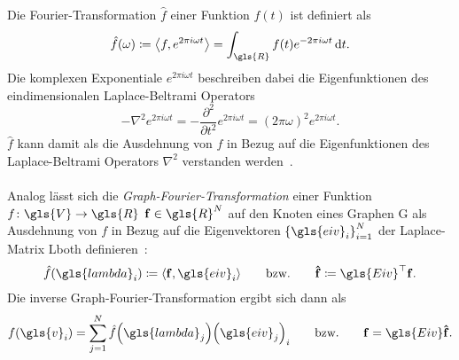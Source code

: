 Die Fourier-Transformation $\hat f$ einer Funktion $f\left(t\right)$ ist definiert als~\cite{Shuman}
\begin{equation*}
  \hat f\left(\omega\right) \coloneqq \left\langle f, e^{2\pi i\omega t} \right\rangle = \int_{\gls{R}} f\left(t\right)e^{-2\pi i\omega t}\,\mathrm{d}t.
\end{equation*}
Die komplexen Exponentiale $e^{2\pi i\omega t}$ beschreiben dabei die Eigenfunktionen des eindimensionalen Laplace-Beltrami Operators~\cite{Shuman}
\begin{equation}
  - \nabla^2 e^{2\pi i\omega t} = - \frac{\partial^2}{\partial t^2} e^{2\pi i \omega t} = {\left(2\pi \omega\right)}^2 e^{2\pi i\omega t}.
  \label{eq:laplace_eigenfunktionen}
\end{equation}
$\hat f$ kann damit als die Ausdehnung von $f$ in Bezug auf die Eigenfunktionen des Laplace-Beltrami Operators $\nabla^2$ verstanden werden~\cite{Hammond}.
\\\\
Analog lässt sich die \emph{Graph-Fourier-Transformation} einer Funktion $f \colon \gls{V} \to \gls{R}$ \bzw{} $\ve{f} \in \gls{R}^N$ auf den Knoten eines Graphen \gls{G} als Ausdehnung von $f$ in Bezug auf die Eigenvektoren ${\left\{\gls{eiv}_i\right\}}_{i=1}^N$ der Laplace-Matrix \gls{Lboth} definieren~\cite{Shuman}:
\begin{equation}
  \hat f\left(\gls{lambda}_i\right) \coloneqq \left\langle \ve{f}, \gls{eiv}_i \right\rangle
  \qquad
  \text{\bzw{}}
  \qquad
  \ve{\hat f} \coloneqq \gls{Eiv}^{\top}\ve{f}.
  \label{eq:graph_fourier_transformation}
\end{equation}
Die inverse Graph-Fourier-Transformation ergibt sich dann als~\cite{Shuman}
\begin{equation}
  f\left(\gls{v}_i\right) = \sum_{j=1}^N \hat f\left(\gls{lambda}_j\right) {\left(\gls{eiv}_j\right)}_i
  \qquad
  \text{\bzw{}}
  \qquad
  \ve{f} = \gls{Eiv}\ve{\hat f}.
  \label{eq:inverse_graph_fourier_transformation}
\end{equation}

